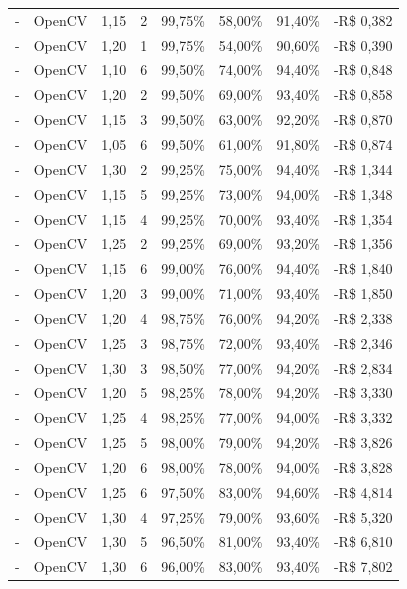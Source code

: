 \begin{table}[htbp]
\begin{tabular}{clrrrrrr}
      - & OpenCV & 1,15 & 2 & 99,75\% & 58,00\% & 91,40\% & -R\$ 0,382 \\
      - & OpenCV & 1,20 & 1 & 99,75\% & 54,00\% & 90,60\% & -R\$ 0,390 \\
      - & OpenCV & 1,10 & 6 & 99,50\% & 74,00\% & 94,40\% & -R\$ 0,848 \\
      - & OpenCV & 1,20 & 2 & 99,50\% & 69,00\% & 93,40\% & -R\$ 0,858 \\
      - & OpenCV & 1,15 & 3 & 99,50\% & 63,00\% & 92,20\% & -R\$ 0,870 \\
      - & OpenCV & 1,05 & 6 & 99,50\% & 61,00\% & 91,80\% & -R\$ 0,874 \\
      - & OpenCV & 1,30 & 2 & 99,25\% & 75,00\% & 94,40\% & -R\$ 1,344 \\
      - & OpenCV & 1,15 & 5 & 99,25\% & 73,00\% & 94,00\% & -R\$ 1,348 \\
      - & OpenCV & 1,15 & 4 & 99,25\% & 70,00\% & 93,40\% & -R\$ 1,354 \\
      - & OpenCV & 1,25 & 2 & 99,25\% & 69,00\% & 93,20\% & -R\$ 1,356 \\
      - & OpenCV & 1,15 & 6 & 99,00\% & 76,00\% & 94,40\% & -R\$ 1,840 \\
      - & OpenCV & 1,20 & 3 & 99,00\% & 71,00\% & 93,40\% & -R\$ 1,850 \\
      - & OpenCV & 1,20 & 4 & 98,75\% & 76,00\% & 94,20\% & -R\$ 2,338 \\
      - & OpenCV & 1,25 & 3 & 98,75\% & 72,00\% & 93,40\% & -R\$ 2,346 \\
      - & OpenCV & 1,30 & 3 & 98,50\% & 77,00\% & 94,20\% & -R\$ 2,834 \\
      - & OpenCV & 1,20 & 5 & 98,25\% & 78,00\% & 94,20\% & -R\$ 3,330 \\
      - & OpenCV & 1,25 & 4 & 98,25\% & 77,00\% & 94,00\% & -R\$ 3,332 \\
      - & OpenCV & 1,25 & 5 & 98,00\% & 79,00\% & 94,20\% & -R\$ 3,826 \\
      - & OpenCV & 1,20 & 6 & 98,00\% & 78,00\% & 94,00\% & -R\$ 3,828 \\
      - & OpenCV & 1,25 & 6 & 97,50\% & 83,00\% & 94,60\% & -R\$ 4,814 \\
      - & OpenCV & 1,30 & 4 & 97,25\% & 79,00\% & 93,60\% & -R\$ 5,320 \\
      - & OpenCV & 1,30 & 5 & 96,50\% & 81,00\% & 93,40\% & -R\$ 6,810 \\
      - & OpenCV & 1,30 & 6 & 96,00\% & 83,00\% & 93,40\% & -R\$ 7,802 \\
      \end{tabular}
 \end{table}

